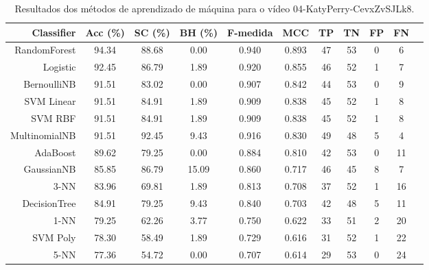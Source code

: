 \begin{table}[!htb]
\centering
\caption{Resultados dos métodos de aprendizado de máquina para o vídeo 04-KatyPerry-CevxZvSJLk8.}
\label{tab:04-KatyPerry-CevxZvSJLk8}
\begin{tabular}{r|c|c|c|c|c|c|c|c|c|c}
\hline\hline
Classifier & Acc (\%) & SC (\%) & BH (\%) & F-medida & MCC & TP & TN & FP & FN \\ \hline
RandomForest & 94.34 & 88.68 & 0.00 & 0.940 & 0.893 & 47 & 53 & 0 & 6 \\ 
Logistic & 92.45 & 86.79 & 1.89 & 0.920 & 0.855 & 46 & 52 & 1 & 7 \\ 
BernoulliNB & 91.51 & 83.02 & 0.00 & 0.907 & 0.842 & 44 & 53 & 0 & 9 \\ 
SVM Linear & 91.51 & 84.91 & 1.89 & 0.909 & 0.838 & 45 & 52 & 1 & 8 \\ 
SVM RBF & 91.51 & 84.91 & 1.89 & 0.909 & 0.838 & 45 & 52 & 1 & 8 \\ 
MultinomialNB & 91.51 & 92.45 & 9.43 & 0.916 & 0.830 & 49 & 48 & 5 & 4 \\ 
AdaBoost & 89.62 & 79.25 & 0.00 & 0.884 & 0.810 & 42 & 53 & 0 & 11 \\ 
GaussianNB & 85.85 & 86.79 & 15.09 & 0.860 & 0.717 & 46 & 45 & 8 & 7 \\ 
3-NN & 83.96 & 69.81 & 1.89 & 0.813 & 0.708 & 37 & 52 & 1 & 16 \\ 
DecisionTree & 84.91 & 79.25 & 9.43 & 0.840 & 0.703 & 42 & 48 & 5 & 11 \\ 
1-NN & 79.25 & 62.26 & 3.77 & 0.750 & 0.622 & 33 & 51 & 2 & 20 \\ 
SVM Poly & 78.30 & 58.49 & 1.89 & 0.729 & 0.616 & 31 & 52 & 1 & 22 \\ 
5-NN & 77.36 & 54.72 & 0.00 & 0.707 & 0.614 & 29 & 53 & 0 & 24 \\ 
\hline\hline
\end{tabular}
\end{table}
